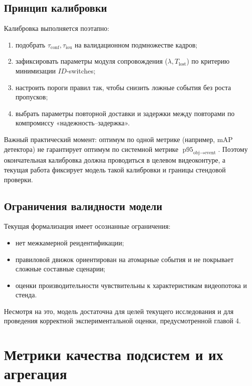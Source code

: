 \subsection{Принцип калибровки}

Калибровка выполняется поэтапно:
\begin{enumerate}
    \item подобрать \(\tau_{\text{conf}}, \tau_{\text{iou}}\) на валидационном подмножестве кадров;
    \item зафиксировать параметры модуля сопровождения (\(\lambda, T_{\text{lost}}\)) по критерию минимизации \(ID\)-switches;
    \item настроить пороги правил так, чтобы снизить ложные события без роста пропусков;
    \item выбрать параметры повторной доставки и задержки между повторами по компромиссу «надежность--задержка».
\end{enumerate}

Важный практический момент: оптимум по одной метрике (например, mAP детектора) не гарантирует оптимум по системной метрике \(\operatorname{p95}_{\text{obj}\to\text{event}}\). Поэтому окончательная калибровка должна проводиться в целевом видеоконтуре, а текущая работа фиксирует модель такой калибровки и границы стендовой проверки.

\subsection{Ограничения валидности модели}

Текущая формализация имеет осознанные ограничения:
\begin{itemize}
    \item нет межкамерной реидентификации;
    \item правиловой движок ориентирован на атомарные события и не покрывает сложные составные сценарии;
    \item оценки производительности чувствительны к характеристикам видеопотока и стенда.
\end{itemize}

Несмотря на это, модель достаточна для целей текущего исследования и для проведения корректной экспериментальной оценки, предусмотренной главой 4.

\section{Метрики качества подсистем и их агрегация}

